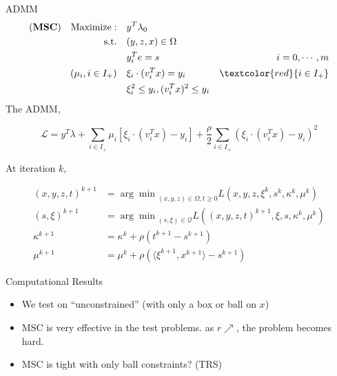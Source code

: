 \documentclass[aspectratio=1610, 10pt]{beamer}
\newcommand{\model}[1]{(\textbf{#1})}
\newcommand{\red}[1]{\textcolor{red}{#1}}
\begin{document}
\begin{frame}{ADMM}
  \begin{align}
    \model{MSC} \quad \mathrm{Maximize: }\quad & y ^T\lambda_0                                         \\
    \mathrm{s.t.} \quad                        & (y,z,x) \in \Omega                                    \\
                                               & y_i^Te = s                           & i=0, \cdots, m \\
    ( \mu_i, i\in I_+ )    \quad               & \xi_i \cdot (v_i^Tx) = y_i           & \red{i\in I_+} \\
                                               & \xi_i^2 \le y_i,  (v_i^Tx)^2 \le y_i
  \end{align}
  The ADMM,

  \begin{equation}
    \mathcal L = y^T\lambda + \sum_{i \in I_+} \mu_i \left [\xi_i \cdot(v_i^Tx) - y_i\right] + \frac{\rho}{2}\sum_{i \in I_+} (\xi_i \cdot (v_i^Tx) - y_i)^2
  \end{equation}

  At iteration \(k\),

  \begin{align*}
    (x,y,z,t)^{k+1} & = {\arg\min}_{(x,y,z)\in\Omega, t\ge 0} L\left(x,y,z,\xi^k,s^k,\kappa^k,\mu^k\right)       \\
    (s, \xi)^{k+1}  & = {\arg\min}_{(s, \xi)\in\mathscr{Q}} L\left((x,y,z,t)^{k+1},\xi,s, \kappa^k, \mu^k\right) \\
    \kappa^{k+1}    & = \kappa^k + \rho\left(t^{k+1}-s^{k+1}\right)                                              \\
    \mu^{k+1}       & = \mu^k + \rho\left( \langle\xi^{k+1}, x^{k+1}\rangle - s^{k+1}\right)
  \end{align*}

\end{frame}
\begin{frame}[allowframebreaks]{Computational Results}
  \begin{itemize}
    \item We test on ``unconstrained'' (with only a box or ball on \(x\))
    \item MSC is very effective in the test problems. as \(r \nearrow \), the problem becomes hard.
    \item MSC is tight with only ball constraints? (TRS)
  \end{itemize}
\end{frame}
\end{document}
